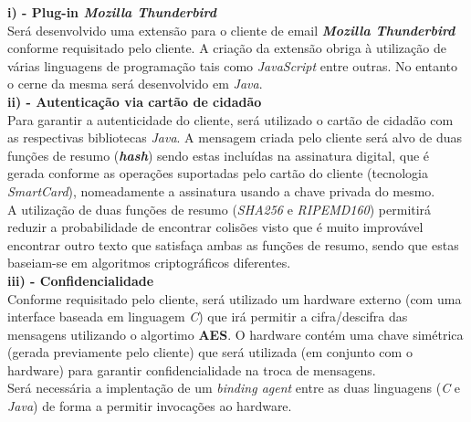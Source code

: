 \documentclass[times, 10pt,twocolumn]{article}
\begin{document}


\noindent \textbf{ i) - Plug-in \emph{Mozilla Thunderbird}}\\
\indent Ser\'a desenvolvido uma extens\~ao para o cliente de email \textbf{\emph{Mozilla Thunderbird}} conforme requisitado pelo cliente. A cria\c{c}\~ao da extens\~ao obriga \`a utiliza\c{c}\~ao de v\'arias linguagens de programa\c{c}\~ao tais como \emph{JavaScript} entre outras. No entanto o cerne da mesma ser\'a desenvolvido em \emph{Java}. \\

\noindent \textbf{ii) - Autentica\c{c}\~ao via cart\~ao de cidad\~ao}\\
\indent Para garantir a autenticidade do cliente, ser\'a utilizado o cart\~ao de cidad\~ao com as respectivas bibliotecas \emph{Java}. A mensagem criada pelo cliente ser\'a alvo de duas fun\c{c}\~oes de resumo (\textbf{\emph{hash}}) sendo estas inclu\'idas na assinatura digital, que \'e gerada conforme as opera\c{c}\~oes suportadas pelo cart\~ao do cliente (tecnologia \emph{SmartCard}), nomeadamente a assinatura usando a chave privada do mesmo. \\
\indent A utiliza\c{c}\~ao de duas fun\c{c}\~oes de resumo (\emph{SHA256} e \emph{RIPEMD160}) permitir\'a reduzir a probabilidade de encontrar colis\~oes visto que \'e muito improv\'avel encontrar outro texto que satisfa\c{c}a ambas as fun\c{c}\~oes de resumo, sendo que estas baseiam-se em algoritmos criptogr\'aficos diferentes.\\

\noindent \textbf{iii) - Confidencialidade}\\
\indent Conforme requisitado pelo cliente, ser\'a utilizado um hardware externo (com uma interface baseada em linguagem \emph{C}) que ir\'a permitir a cifra/descifra das mensagens utilizando o algortimo \textbf{AES}. O hardware cont\'em uma chave sim\'etrica (gerada previamente pelo cliente) que ser\'a utilizada (em conjunto com o hardware) para garantir confidencialidade na troca de mensagens.\\
\indent Ser\'a necess\'aria a implenta\c{c}\~ao de um \emph{binding agent} entre as duas linguagens (\emph{C} e \emph{Java}) de forma a permitir invoca\c{c}\~oes ao hardware.\\
\end{document}
